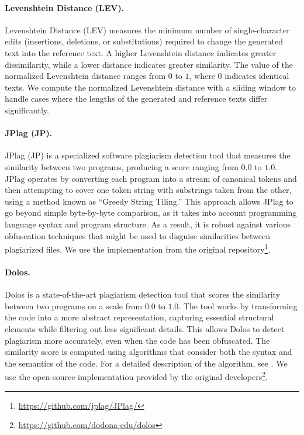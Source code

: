 \paragraph{Levenshtein Distance (LEV).}
Levenshtein Distance (LEV) measures the minimum number of single-character edits (insertions, deletions, or substitutions) required to change the generated text into the reference text. A higher Levenshtein distance indicates greater dissimilarity, while a lower distance indicates greater similarity. The value of the normalized Levenshtein distance ranges from \(0\) to \(1\), where \(0\) indicates identical texts. We compute the normalized Levenshtein distance with a sliding window to handle cases where the lengths of the generated and reference texts differ significantly.

\paragraph{JPlag (JP).}
JPlag (JP) \citep{prechelt2002finding} is a specialized software plagiarism detection tool that measures the similarity between two programs, producing a score ranging from \(0.0\) to \(1.0\). JPlag operates by converting each program into a stream of canonical tokens and then attempting to cover one token string with substrings taken from the other, using a method known as ``Greedy String Tiling.'' This approach allows JPlag to go beyond simple byte-by-byte comparison, as it takes into account programming language syntax and program structure. As a result, it is robust against various obfuscation techniques that might be used to disguise similarities between plagiarized files. We use the implementation from the original repository\footnote{\href{https://github.com/jplag/JPlag/}{https://github.com/jplag/JPlag/}}.

\paragraph{Dolos.}
Dolos \citep{maertens2022dolos} is a state-of-the-art plagiarism detection tool that scores the similarity between two programs on a scale from \(0.0\) to \(1.0\). The tool works by transforming the code into a more abstract representation, capturing essential structural elements while filtering out less significant details. This allows Dolos to detect plagiarism more accurately, even when the code has been obfuscated. The similarity score is computed using algorithms that consider both the syntax and the semantics of the code. For a detailed description of the algorithm, see \citet{maertens2022dolos}. We use the open-source implementation provided by the original developers\footnote{\href{https://github.com/dodona-edu/dolos}{https://github.com/dodona-edu/dolos}}.


